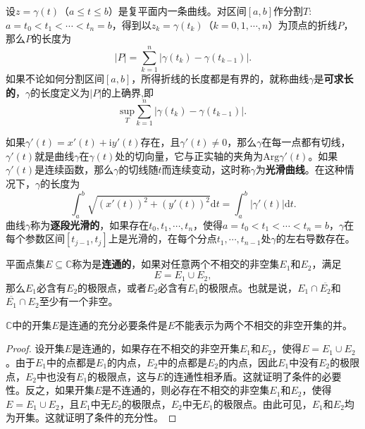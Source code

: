 \documentclass[../../main.tex]{subfiles}%
\begin{document}
\begin{definition}\label{definition:复平面上的光滑曲线}
设\(z = \gamma(t)\)（\(a \leqslant t \leqslant b\)）是复平面内一条曲线。对区间\([a, b]\)作分割$T:$ \(a = t_0 < t_1 < \cdots < t_n = b\)，得到以\(z_k = \gamma(t_k)\)（\(k = 0, 1, \cdots, n\)）为顶点的折线\(P\)，那么\(P\)的长度为
\[
|P| = \sum_{k = 1}^n | \gamma(t_k) - \gamma(t_{k - 1}) |.
\]
如果不论如何分割区间\([a, b]\)，所得折线的长度都是有界的，就称曲线\(\gamma\)是\textbf{可求长的}，\(\gamma\)的长度定义为\(|P|\)的上确界,即$$\underset{T}{\mathrm{sup}}\sum_{k=1}^n{|\gamma (t_k)}-\gamma (t_{k-1})|.$$

如果\(\gamma'(t) = x'(t) + \mathrm{i}y'(t)\)存在，且\(\gamma'(t) \neq 0\)，那么\(\gamma\)在每一点都有切线，\(\gamma'(t)\)就是曲线\(\gamma\)在\(\gamma(t)\)处的切向量，它与正实轴的夹角为\(\mathrm{Arg}\gamma'(t)\)。如果\(\gamma'(t)\)是连续函数，那么\(\gamma\)的切线随\(t\)而连续变动，这时称\(\gamma\)为\textbf{光滑曲线}。在这种情况下，\(\gamma\)的长度为
\[
\int_a^b \sqrt{(x'(t))^2 + (y'(t))^2} \mathrm{d}t = \int_a^b | \gamma'(t) | \mathrm{d}t.
\]
曲线\(\gamma\)称为\textbf{逐段光滑的}，如果存在\(t_0, t_1, \cdots, t_n\)，使得\(a = t_0 < t_1 < \cdots < t_n = b\)，\(\gamma\)在每个参数区间\([t_{j - 1}, t_j]\)上是光滑的，在每个分点\(t_1, \cdots, t_{n - 1}\)处\(\gamma\)的左右导数存在。
\end{definition}

\begin{definition}
平面点集\(E\subseteq \mathbb{C}\)称为是\textbf{连通的}，如果对任意两个不相交的非空集\(E_1\)和\(E_2\)，满足
\[
E = E_1 \cup E_2,
\]
那么\(E_1\)必含有\(E_2\)的极限点，或者\(E_2\)必含有\(E_1\)的极限点。也就是说，\(E_1 \cap \overline{E_2}\)和\(\overline{E_1} \cap E_2\)至少有一个非空。
\end{definition}

\begin{proposition}\label{proposition:集合连通的条件}
\(\mathbb{C}\)中的开集\(E\)是连通的充分必要条件是\(E\)不能表示为两个不相交的非空开集的并。
\end{proposition}
\begin{proof}

设开集\(E\)是连通的，如果存在不相交的非空开集\(E_1\)和\(E_2\)，使得\(E = E_1 \cup E_2\)。由于\(E_1\)中的点都是\(E_1\)的内点，\(E_2\)中的点都是\(E_2\)的内点，因此\(E_1\)中没有\(E_2\)的极限点，\(E_2\)中也没有\(E_1\)的极限点，这与\(E\)的连通性相矛盾。这就证明了条件的必要性。反之，如果开集\(E\)是不连通的，则必存在不相交的非空集\(E_1\)和\(E_2\)，使得\(E = E_1 \cup E_2\)，且\(E_1\)中无\(E_2\)的极限点，\(E_2\)中无\(E_1\)的极限点。由此可见，\(E_1\)和\(E_2\)均为开集。这就证明了条件的充分性。 

\end{proof}
\end{document}
